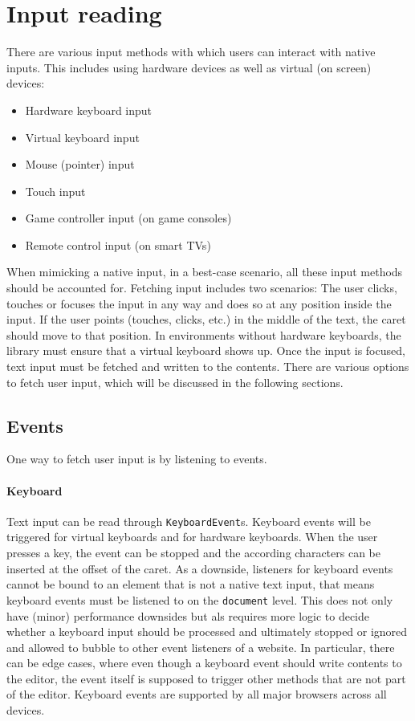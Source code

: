 
\section{Input reading}

There are various input methods with which users can interact with native inputs. This includes using hardware devices as well as virtual (on screen) devices:

\begin{itemize} 
\item Hardware keyboard input
\item Virtual keyboard input
\item Mouse (pointer) input
\item Touch input
\item Game controller input (on game consoles)
\item Remote control input (on smart TVs)
\end{itemize}

When mimicking a native input, in a best-case scenario, all these input methods should be accounted for. Fetching input includes two scenarios: The user clicks, touches or focuses the input in any way and does so at any position inside the input. If the user points (touches, clicks, etc.) in the middle of the text, the caret should move to that position. In environments without hardware keyboards, the library must ensure that a virtual keyboard shows up. Once the input is focused, text input must be fetched and written to the contents. There are various options to fetch user input, which will be discussed in the following sections.

\subsection{Events} 

One way to fetch user input is by listening to events.

\paragraph{Keyboard} Text input can be read through \texttt{KeyboardEvent}s. Keyboard events will be triggered for virtual keyboards and for hardware keyboards. When the user presses a key, the event can be stopped and the according characters can be inserted at the offset of the caret. As a downside, listeners for keyboard events cannot be bound to an element that is not a native text input, that means keyboard events must be listened to on the \texttt{document} level. This does not only have (minor) performance downsides but als requires more logic to decide whether a keyboard input should be processed and ultimately stopped or ignored and allowed to bubble to other event listeners of a website. In particular, there can be edge cases, where even though a keyboard event should write contents to the editor, the event itself is supposed to trigger other methods that are not part of the editor. Keyboard events are supported by all major browsers across all devices.

